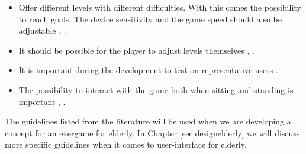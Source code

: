 \begin{itemize}
\item Offer different levels with different difficulties. With this comes the possibility to reach goals. The device sensitivity and the game speed should also be adjustable \cite{gregor}, \cite{gerling1}.
\item It should be possible for the player to adjust levels themselves \cite{gregor}, \cite{gerling1}. 
\item It is important during the development to test on representative users \cite{gregor}.
\item The possibility to interact with the game both when sitting and standing is important \cite{gerling1}, \cite{gerling2}.
\end{itemize}

The guidelines listed from the literature will be used when we are developing a concept for an exergame for elderly. In Chapter \ref{sec:designelderly} we will discuss more specific guidelines when it comes to user-interface for elderly. 






